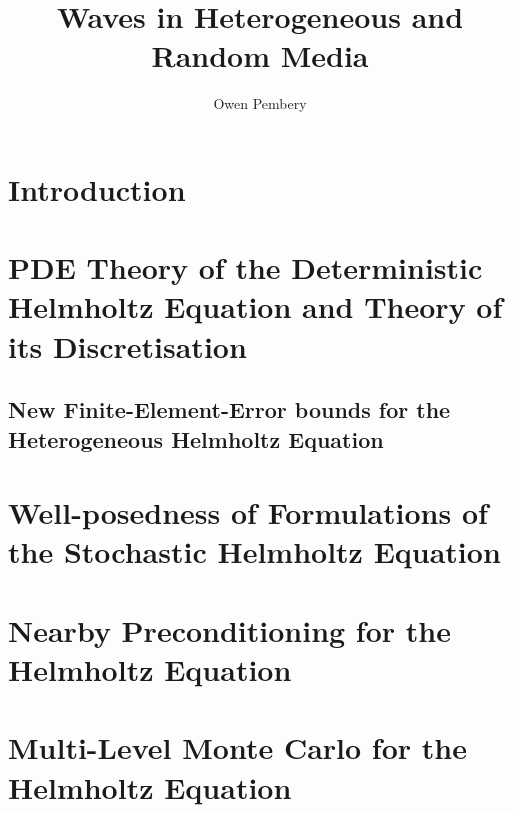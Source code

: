 \documentclass{report}
\title{Waves in Heterogeneous and Random Media}
\author{Owen Pembery}
\begin{document}
\maketitle

\chapter{Introduction}\label{chap:intro}


\chapter{PDE Theory of the Deterministic Helmholtz Equation and Theory of its Discretisation}\label{chap:background}


\section{New Finite-Element-Error bounds for the Heterogeneous Helmholtz Equation}\label{sec:fem}







\chapter{Well-posedness of Formulations of the Stochastic Helmholtz Equation}\label{chap:stochastic}
 
















\chapter{Nearby Preconditioning for the Helmholtz Equation}\label{chap:nbpc}


\chapter{Multi-Level Monte Carlo for the Helmholtz Equation}\label{chap:mlmc}
\end{document}
